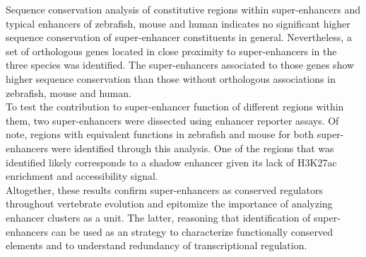 			Sequence conservation analysis of constitutive regions within super-enhancers and typical enhancers of zebrafish, mouse and human indicates no significant higher sequence conservation of super-enhancer constituents in general. Nevertheless, a set of orthologous genes located in close proximity to super-enhancers in the three species was identified. The super-enhancers associated to those genes show higher sequence conservation than those without orthologous associations in zebrafish, mouse and human.\\

			To test the contribution to super-enhancer function of different regions within them, two super-enhancers were dissected using enhancer reporter assays. Of note, regions with equivalent functions in zebrafish and mouse for both super-enhancers were identified through this analysis. One of the regions that was identified likely corresponds to a shadow enhancer given its lack of H3K27ac enrichment and accessibility signal.\\

			Altogether, these results confirm super-enhancers as conserved regulators throughout vertebrate evolution and epitomize the importance of analyzing enhancer clusters as a unit. The latter, reasoning that identification of super-enhancers can be used as an strategy to characterize functionally conserved elements and to understand redundancy of transcriptional regulation.\\

		

		

		

		

		

		

		

